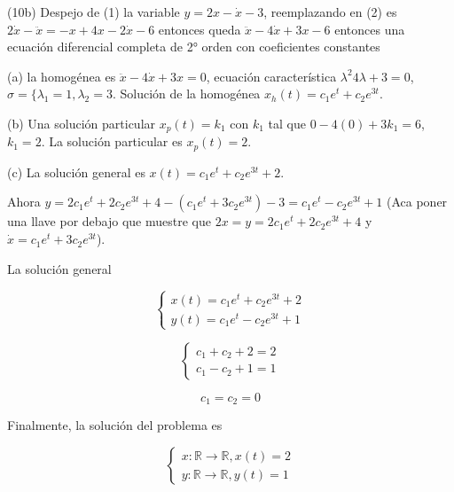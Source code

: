 \begin{exercise}

(10b) Despejo de (1) la variable $y = 2x - \dot{x} -3$, reemplazando en (2) es $2\dot{x} - \ddot{x} = -x + 4x - 2\dot{x} - 6$ entonces queda $\ddot{x} - 4\dot{x} + 3x - 6$ entonces una ecuaci\'on diferencial completa de 2° orden con coeficientes constantes 

(a) la homog\'enea es $\ddot{x} - 4\dot{x} + 3x = 0$, ecuaci\'on caracter\'istica $\lambda ^2  4\lambda + 3 = 0$, $\sigma = \lbrace \lambda_1 = 1, \lambda_2 = 3$. Soluci\'on de la homog\'enea $x_h(t) = c_1e^t + c_2e^{3t}$.

(b) Una soluci\'on particular $x_p(t) = k_1$ con $k_1$ tal que $0 - 4(0) + 3k_1 = 6$, $k_1 = 2$. La soluci\'on particular es $x_p(t)=2$.

(c) La soluci\'on general es $x(t) = c_1e^t + c_2e^{3t} + 2$.

Ahora $y = 2c_1e^t + 2c_2e^{3t} + 4 - (c_1e^t + 3c_2e^{3t}) - 3 = c_1 e^t - c_2e^{3t} + 1$ (Aca poner una llave por debajo que muestre que $2x = y = 2c_1e^t + 2c_2e^{3t} + 4$  y $\dot{x} = c_1e^t + 3c_2e^{3t}$).

La soluci\'on general

\begin{equation}
\begin{cases}
	x(t) = c_1e^t + c_2e^{3t} + 2 \\
	y(t) = c_1e^t - c_2e^{3t} + 1	
\end{cases}
\end{equation}


\begin{equation}
\begin{cases}
	c_1 + c_2 + 2 = 2 \\
	c_1 - c_2 + 1 = 1
\end{cases}
\end{equation}


$$
c_1 = c_2 = 0
$$

Finalmente, la soluci\'on del problema es

\begin{equation}
\begin{cases}
	x: \mathbb{R} \rightarrow \mathbb{R}, x(t) = 2 \\
	y: \mathbb{R} \rightarrow \mathbb{R}, y(t) = 1
\end{cases}
\end{equation}

\end{exercise}

